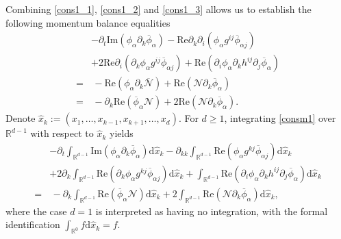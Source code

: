 \documentclass[10pt,twoside,a4paper]{article}
\numberwithin{equation}{section}\allowdisplaybreaks
\def\geq{\geqslant}
\begin{document}


Combining \eqref{cons1_1}, \eqref{cons1_2} and \eqref{cons1_3} allows us to establish the following  momentum balance equalities
	\begin{align} \label{consm1}
	&-\partial_t \mathrm{Im}\left( \phi_{\alpha } \partial_k \overline{\phi}_\alpha \right)-\mathrm{Re}\partial_k\partial_i\left( \phi_{\alpha }   g^{ij} \overline{\phi}_{\alpha j}\right)\nonumber\\
	&+ 2\mathrm{Re}\partial_{i}\left(\partial_k \phi_{\alpha }  g^{ij} \overline{\phi}_{\alpha j}\right)+\mathrm{Re}\left(\partial_{i} \phi_{\alpha }  \partial_k h^{ij} \partial_j \overline{\phi}_{\alpha }\right) \\
	=&\,-\mathrm{Re}\left( \phi_{\alpha } \partial_k\overline{\mathcal{N}} \right)+\mathrm{Re} \left(\mathcal{N} \partial_k \overline{\phi}_\alpha\right)\nonumber\\
	=&\,-\partial_k\mathrm{Re}\left( \overline{\phi }_{\alpha } \mathcal{N}\right)+2\mathrm{Re} \left(\mathcal{N} \partial_k \overline{\phi}_\alpha\right) \nonumber.
\end{align}
Denote $ \hat{x}_k:=\left(x_1,\dots,x_{k-1},x_{k+1},\dots,x_d\right) $. For \( d \geq 1 \), integrating \eqref{consm1} over \( \mathbb{R}^{d-1} \) with respect to \( \hat{x}_k \) yields
	\begin{align} \label{consm2}
	&	-\partial_t \int_{\mathbb{R}^{d-1}}  \mathrm{Im}\left( \phi_{\alpha } \partial_k \overline{\phi}_\alpha \right) \mathrm{d} \hat{x}_k-\partial_{kk} \int_{\mathbb{R}^{d-1}} \mathrm{Re}\left( \phi_{\alpha }   g^{kj} \overline{\phi}_{\alpha j}\right) \mathrm{d} \hat{x}_k\nonumber\\
	&+2 \partial_k \int_{\mathbb{R}^{d-1}} \mathrm{Re}\left(\partial_k \phi_{\alpha }  g^{kj} \overline{\phi}_{\alpha j}\right) \mathrm{d} \hat{x}_k + \int_{\mathbb{R}^{d-1}}  \mathrm{Re}\left(\partial_{i} \phi_{\alpha }  \partial_k h^{ij} \partial_j \overline{\phi}_{\alpha }\right)  \mathrm{d} \hat{x}_k \\
	=&\,- \partial_k\int_{\mathbb{R}^{d-1}}   \mathrm{Re}\left( \overline{\phi }_{\alpha } \mathcal{N}\right)\mathrm{d} \hat{x}_k+2\int_{\mathbb{R}^{d-1}} \mathrm{Re} \left(\mathcal{N} \partial_k \overline{\phi}_\alpha\right)   \mathrm{d} \hat{x}_k \nonumber,
\end{align}
where the case \( d = 1 \) is interpreted as having no integration, with the formal identification \( \int_{\mathbb{R}^{0}} f  \mathrm{d} \hat{x}_k = f \).
\end{document}
